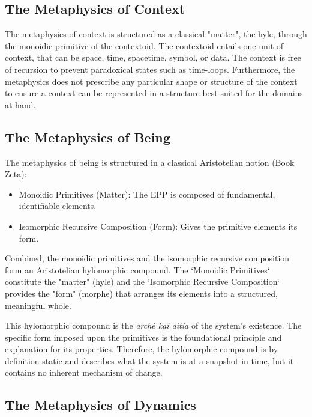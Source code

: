 \subsection{The Metaphysics of Context} 
\label{sec:metaphysics_context}

The metaphysics of context is structured as a classical "matter", the hyle, through the
monoidic primitive of the contextoid. The contextoid entails one unit of context, that can be
space, time, spacetime, symbol, or data. The context is free of recursion to prevent paradoxical states such as time-loops. Furthermore, the metaphysics does not prescribe any particular shape or structure of the context to ensure a context can be represented in a structure best suited for the domains at hand.


\subsection{The Metaphysics of Being} 
\label{sec:metaphysics_being}

The metaphysics of being is structured in a classical Aristotelian notion (Book Zeta\cite{furth1985metaphysics}): 

\begin{itemize}
	\item Monoidic Primitives (Matter): The EPP is composed of fundamental, identifiable elements.
	\item Isomorphic Recursive Composition (Form): Gives the primitive elements its form. 
\end{itemize}

Combined, the monoidic primitives and the isomorphic recursive composition form an Aristotelian hylomorphic compound. The `Monoidic Primitives` constitute the "matter" (hyle) and the `Isomorphic Recursive Composition` provides the "form" (morphe) that arranges its elements into a structured, meaningful whole.

This hylomorphic compound is the  \textit{archê kai aitia} of the system's existence. The specific form imposed upon the primitives is the foundational principle and explanation for its properties. Therefore, the hylomorphic compound is by definition static and describes what the system is at a snapshot in time, but it contains no inherent mechanism of change. 

\newpage

\subsection{The Metaphysics of Dynamics} 
\label{sec:metaphysics_dynamics}


